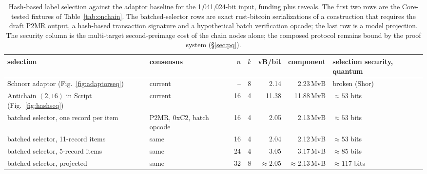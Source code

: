 \documentclass[11pt]{article}
\begin{document}
\begin{table}[t!]\centering\footnotesize\setlength{\tabcolsep}{4pt}
\begin{tabularx}{\textwidth}{>{\raggedright\arraybackslash}p{3.1cm}>{\raggedright\arraybackslash}p{2.5cm}rrrr>{\raggedright\arraybackslash}X}\toprule
selection & consensus & $n$ & $k$ & vB/bit & component & selection security, quantum\\\midrule
Schnorr adaptor (Fig.~\ref{fig:adaptorseq}) & current & -- & 8 & 2.14 & 2.23\,MvB & broken (Shor)\\
Antichain $(2,16)$ in Script (Fig.~\ref{fig:hashseq}) & current & 16 & 4 & 11.38 & 11.88\,MvB & $\approx53$ bits\\
batched selector, one record per item & P2MR, 0xC2, batch opcode & 16 & 4 & 2.05 & 2.13\,MvB & $\approx53$ bits\\
batched selector, 11-record items & same & 16 & 4 & 2.04 & 2.12\,MvB & $\approx53$ bits\\
batched selector, 5-record items & same & 24 & 4 & 3.05 & 3.17\,MvB & $\approx85$ bits\\
batched selector, projected & same & 32 & 8 & $\approx2.05$ & $\approx2.13$\,MvB & $\approx117$ bits\\\bottomrule
\end{tabularx}
\caption{Hash-based label selection against the adaptor baseline for the
1{,}041{,}024-bit input, funding plus reveals. The first two rows are the
Core-tested fixtures of Table~\ref{tab:onchain}. The batched-selector rows are
exact rust-bitcoin serializations of a construction that requires the draft
P2MR output, a hash-based transaction signature and a hypothetical batch
verification opcode; the last row is a model projection. The security column
is the multi-target second-preimage cost of the chain nodes alone; the
composed protocol remains bound by the proof system (\S\ref{sec:pq}).}
\label{tab:pqsel}
\end{table}
\end{document}
